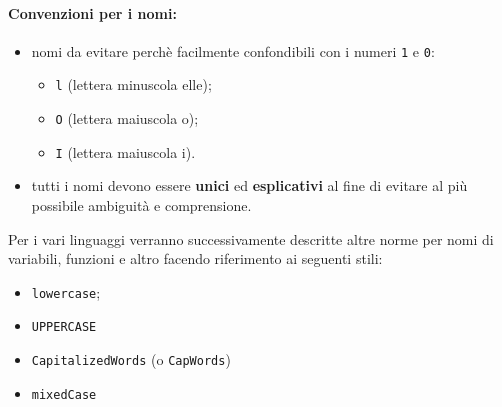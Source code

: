 \documentclass[NormeDiProgetto.tex]{subfiles}
\begin{document}
\paragraph*{Convenzioni per i nomi: }
\begin{itemize}
	\item nomi da evitare perchè facilmente confondibili con i numeri \texttt{1} e \texttt{0}:
	\begin{itemize}
		\item \texttt{l} (lettera minuscola elle);
		\item \texttt{O} (lettera maiuscola o);
		\item \texttt{I} (lettera maiuscola i).
	\end{itemize}
	\item tutti i nomi devono essere \textbf{unici} ed \textbf{esplicativi} al fine di evitare al più possibile ambiguità e comprensione.
\end{itemize}
Per i vari linguaggi verranno successivamente descritte altre norme per nomi di variabili, funzioni e altro facendo riferimento ai seguenti stili:
\begin{itemize}
	\item \texttt{lowercase};
	\item \texttt{UPPERCASE}
	\item \texttt{CapitalizedWords} (o \texttt{CapWords})
	\item \texttt{mixedCase}
	
	
\end{itemize}
\end{document}
